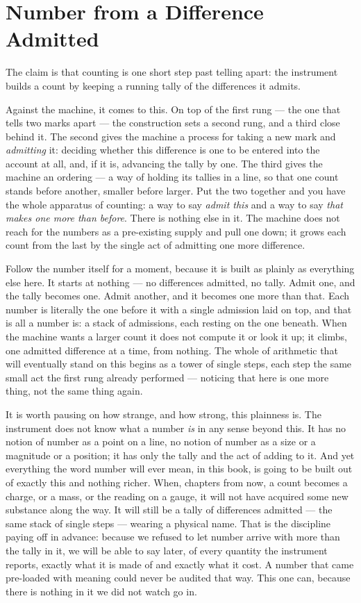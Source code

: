 \section{Number from a Difference Admitted}

The claim is that counting is one short step past telling apart: the instrument builds a count by keeping a
running tally of the differences it admits.

Against the machine, it comes to this. On top of the first rung --- the one that tells two marks apart --- the
construction sets a second rung, and a third close behind it. The second gives the machine a process for taking a
new mark and \emph{admitting} it: deciding whether this difference is one to be entered into the account at all,
and, if it is, advancing the tally by one. The third gives the machine an ordering --- a way of holding its
tallies in a line, so that one count stands before another, smaller before larger. Put the two together and you
have the whole apparatus of counting: a way to say \emph{admit this} and a way to say \emph{that makes one more
than before}. There is nothing else in it. The machine does not reach for the numbers as a pre-existing supply
and pull one down; it grows each count from the last by the single act of admitting one more difference.

Follow the number itself for a moment, because it is built as plainly as everything else here. It starts at
nothing --- no differences admitted, no tally. Admit one, and the tally becomes one. Admit another, and it
becomes one more than that. Each number is literally the one before it with a single admission laid on top, and
that is all a number is: a stack of admissions, each resting on the one beneath. When the machine wants a larger
count it does not compute it or look it up; it climbs, one admitted difference at a time, from nothing. The whole
of arithmetic that will eventually stand on this begins as a tower of single steps, each step the same small act
the first rung already performed --- noticing that here is one more thing, not the same thing again.

It is worth pausing on how strange, and how strong, this plainness is. The instrument does not know what a number
\emph{is} in any sense beyond this. It has no notion of number as a point on a line, no notion of number as a
size or a magnitude or a position; it has only the tally and the act of adding to it. And yet everything the word
number will ever mean, in this book, is going to be built out of exactly this and nothing richer. When, chapters
from now, a count becomes a charge, or a mass, or the reading on a gauge, it will not have acquired some new
substance along the way. It will still be a tally of differences admitted --- the same stack of single steps ---
wearing a physical name. That is the discipline paying off in advance: because we refused to let number arrive
with more than the tally in it, we will be able to say later, of every quantity the instrument reports, exactly
what it is made of and exactly what it cost. A number that came pre-loaded with meaning could never be audited
that way. This one can, because there is nothing in it we did not watch go in.

